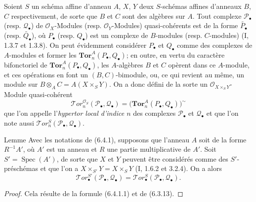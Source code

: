 \begin{env}[6.4.1]
Soient $S$ un schéma affine d'anneau $A$, $X$, $Y$ deux $S$-schémas affines
d'anneaux $B$, $C$ respectivement, de sorte que $B$ et $C$ sont des algèbres
sur $A$. Tout complexe $\mathscr P_\bullet$ (resp. $\mathscr Q_\bullet$) de
$\mathscr O_X$-Modules (resp. $\mathscr O_Y$-Modules) quasi-cohérents est de
la forme $\widetilde{P_\bullet}$ (resp. $\widetilde{Q_\bullet}$), où
$P_\bullet$ (resp. $Q_\bullet$) est un complexe de $B$-modules (resp.
$C$-modules) (I, 1.3.7 et 1.3.8). On peut évidemment considérer $P_\bullet$
et $Q_\bullet$ comme des complexes de $A$-modules et former les
$\mathbf{Tor}_n^A(P_\bullet,Q_\bullet)$; en outre, en vertu du caractère
bifonctoriel de $\mathbf{Tor}_n^A(P_\bullet,Q_\bullet)$, les $A$-algèbres
$B$ et $C$ opèrent dans ce $A$-module, et ces opérations en font un
$(B,C)$-bimodule, ou, ce qui revient au même, un module sur
$B\otimes_A C=A(X\times_S Y)$. On a donc défini de la sorte un
$\mathscr O_{X\times_S Y}$-Module quasi-cohérent
\[
  \mathscr{T}\!or_n^{\mathscr O_S}(\mathscr P_\bullet,\mathscr Q_\bullet)
  =\bigl(\mathbf{Tor}_n^A(P_\bullet,Q_\bullet)\bigr)^{\sim}
  \tag{6.4.1.1}\label{III.6.4.1.1.fr}
\]
que l'on appelle l'\emph{hypertor local d'indice $n$} des complexes
$\mathscr P_\bullet$ et $\mathscr Q_\bullet$ et que l'on note aussi
$\mathscr{T}\!or_n^S(\mathscr P_\bullet,\mathscr Q_\bullet)$.
\end{env}

\begin{namedtheorem}[6.4.2]{Lemme}
Avec les notations de (6.4.1), supposons que l'anneau $A$ soit de la forme
$R^{-1}A'$, où $A'$ est un anneau et $R$ une partie multiplicative de $A'$.
Soit $S'=\operatorname{Spec}(A')$, de sorte que $X$ et $Y$ peuvent être
considérés comme des $S'$-préschémas et que l'on a
$X\times_{S'}Y=X\times_S Y$ (I, 1.6.2 et 3.2.4). On a alors
\[
  \mathscr{T}\!or_\bullet^{S'}(\mathscr P_\bullet,\mathscr Q_\bullet)
  =\mathscr{T}\!or_\bullet^S(\mathscr P_\bullet,\mathscr Q_\bullet).
\]
\end{namedtheorem}

\begin{proof}
Cela résulte de la formule (6.4.1.1) et de (6.3.13).
\end{proof}

